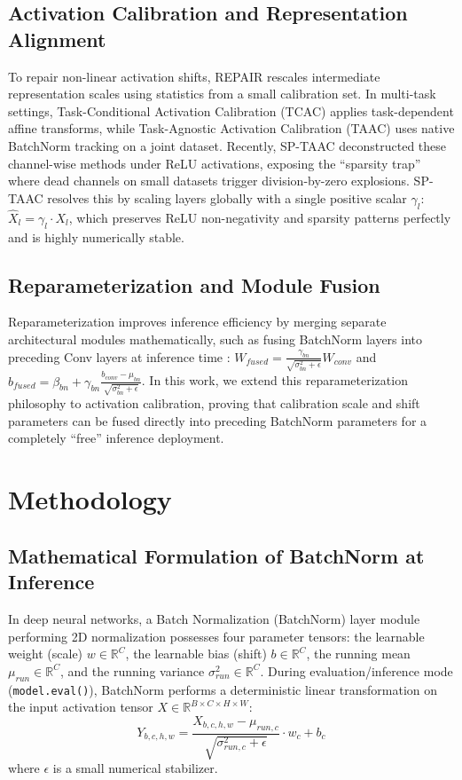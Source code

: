 \documentclass{article}
\begin{document}
\subsection{Activation Calibration and Representation Alignment}
To repair non-linear activation shifts, REPAIR \cite{jordan2022repair} rescales intermediate representation scales using statistics from a small calibration set. In multi-task settings, Task-Conditional Activation Calibration (TCAC) \cite{anonymous2026c} applies task-dependent affine transforms, while Task-Agnostic Activation Calibration (TAAC) \cite{anonymous2026b} uses native BatchNorm tracking on a joint dataset. Recently, SP-TAAC \cite{empiricist2026sptaac} deconstructed these channel-wise methods under ReLU activations, exposing the ``sparsity trap'' where dead channels on small datasets trigger division-by-zero explosions. SP-TAAC resolves this by scaling layers globally with a single positive scalar $\gamma_l$: $\hat{X}_l = \gamma_l \cdot X_l$, which preserves ReLU non-negativity and sparsity patterns perfectly and is highly numerically stable.

\subsection{Reparameterization and Module Fusion}
Reparameterization improves inference efficiency by merging separate architectural modules mathematically, such as fusing BatchNorm layers into preceding Conv layers at inference time \cite{ioffe2015batch, paszke2019pytorch}: $W_{fused} = \frac{\gamma_{bn}}{\sqrt{\sigma_{bn}^2 + \epsilon}} W_{conv}$ and $b_{fused} = \beta_{bn} + \gamma_{bn} \frac{b_{conv} - \mu_{bn}}{\sqrt{\sigma_{bn}^2 + \epsilon}}$. In this work, we extend this reparameterization philosophy to activation calibration, proving that calibration scale and shift parameters can be fused directly into preceding BatchNorm parameters for a completely ``free'' inference deployment.

\section{Methodology}

\subsection{Mathematical Formulation of BatchNorm at Inference}
In deep neural networks, a Batch Normalization (BatchNorm) layer module performing 2D normalization possesses four parameter tensors: the learnable weight (scale) $w \in \mathbb{R}^C$, the learnable bias (shift) $b \in \mathbb{R}^C$, the running mean $\mu_{run} \in \mathbb{R}^C$, and the running variance $\sigma_{run}^2 \in \mathbb{R}^C$.
During evaluation/inference mode (\texttt{model.eval()}), BatchNorm performs a deterministic linear transformation on the input activation tensor $X \in \mathbb{R}^{B \times C \times H \times W}$:
\begin{equation}
    Y_{b, c, h, w} = \frac{X_{b, c, h, w} - \mu_{run, c}}{\sqrt{\sigma_{run, c}^2 + \epsilon}} \cdot w_c + b_c
    \label{eq:bn_eval}
\end{equation}
where $\epsilon$ is a small numerical stabilizer.
\end{document}
